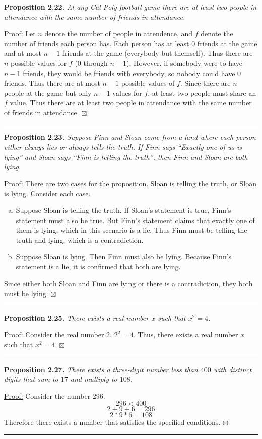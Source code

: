 \documentclass[a4paper,12pt]{article}
\newcommand{\entry}[3]
{
   \noindent\textbf{#1.}
   \emph{#2}
   \bigskip

   \noindent#3
   \bigskip
   \hrule
   \vspace{24pt}
}
\newcommand{\sig}{$\boxtimes$}
\begin{document}
\entry{Proposition 2.22}
{At any Cal Poly football game there are at least two people in attendance with the same number of friends in attendance.}
{
\underline{Proof:} Let $n$ denote the number of people in attendence, and $f$ denote the number of friends each person has. Each person has at least $0$ friends at the game and at most $n - 1$ friends at the game (everybody but themself). Thus there are $n$ possible values for $f$ ($0$ through $n - 1$). However, if somebody were to have $n - 1$ friends, they would be friends with everybody, so nobody could have $0$ friends. Thus there are at most $n - 1$ possible values of $f$. Since there are $n$ people at the game but only $n - 1$ values for $f$, at least two people must share an $f$ value. Thus there are at least two people in attendance with the same number of friends in attendance. \sig
}



\entry{Proposition 2.23}
{Suppose Finn and Sloan come from a land where each person either always lies or always tells the truth. If Finn says ``Exactly one of us is lying'' and Sloan says ``Finn is telling the truth'', then Finn and Sloan are both lying.}
{
\underline{Proof:} There are two cases for the proposition. Sloan is telling the truth, or Sloan is lying. Consider each case.
\begin{enumerate}[(a)]
\item
Suppose Sloan is telling the truth. If Sloan's statement is true, Finn's statement must also be true. But Finn's statement claims that exactly one of them is lying, which in this scenario is a lie. Thus Finn must be telling the truth and lying, which is a contradiction.
\item
Suppose Sloan is lying. Then Finn must also be lying. Because Finn's statement is a lie, it is confirmed that both are lying.
\end{enumerate}
Since either both Sloan and Finn are lying or there is a contradiction, they both must be lying. \sig
}



\entry{Proposition 2.25}
{There exists a real number $x$ such that $x^2 = 4$.}
{\underline{Proof:} Consider the real number $2$. $2^2 = 4$. Thus, there exists a real number $x$ such that $x^2 = 4$. \sig
}



\entry{Proposition 2.27}
{There exists a three-digit number less than $400$ with distinct digits that sum to $17$ and multiply to $108$.}
{
\underline{Proof:} Consider the number $296$. \[ 296 < 400 \] \[ 2 + 9 + 6 = 296 \] \[ 2 * 9 * 6 = 108 \]
Therefore there exists a number that satisfies the specified conditions. \sig
}
\end{document}
